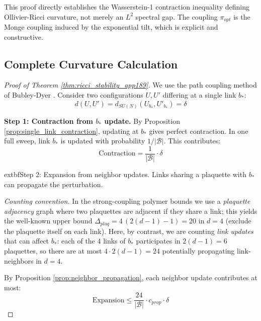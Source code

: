 \begin{remark}
This proof directly establishes the Wasserstein-1 contraction inequality defining Ollivier-Ricci curvature, not merely an $L^2$ spectral gap. The coupling $\pi_{opt}$ is the Monge coupling induced by the exponential tilt, which is explicit and constructive.
\end{remark}

\subsection{Complete Curvature Calculation}

\begin{proof}[Proof of Theorem \ref{thm:ricci_stability_app189}]
We use the path coupling method of Bubley-Dyer \cite{bubley1997path}. Consider two configurations $U, U'$ differing at a single link $b_*$:
\begin{equation}
    d(U, U') = d_{SU(N)}(U_{b_*}, U'_{b_*}) = \delta
\end{equation}

\textbf{Step 1: Contraction from $b_*$ update.}
By Proposition \ref{prop:single_link_contraction}, updating at $b_*$ gives perfect contraction. In one full sweep, link $b_*$ is updated with probability $1/|\mathcal{B}|$. This contributes:
\begin{equation}
    \text{Contraction} = \frac{1}{|\mathcal{B}|} \cdot \delta
\end{equation}

    extbf{Step 2: Expansion from neighbor updates.}
Links sharing a plaquette with $b_*$ can propagate the perturbation.

\emph{Counting convention.} In the strong-coupling polymer bounds we use a \emph{plaquette adjacency} graph where two plaquettes are adjacent if they share a link; this yields the well-known upper bound $\Delta_{plaq}=4\,(2(d-1)-1)=20$ in $d=4$ (exclude the plaquette itself on each link).
Here, by contrast, we are counting \emph{link updates} that can affect $b_*$: each of the 4 links of $b_*$ participates in $2(d-1)=6$ plaquettes, so there are at most $4\cdot 2(d-1)=24$ potentially propagating link-neighbors in $d=4$.

By Proposition \ref{prop:neighbor_propagation}, each neighbor update contributes at most:
\begin{equation}
    \text{Expansion} \leq \frac{24}{|\mathcal{B}|} \cdot c_{prop} \cdot \delta
\end{equation}


\end{proof}
